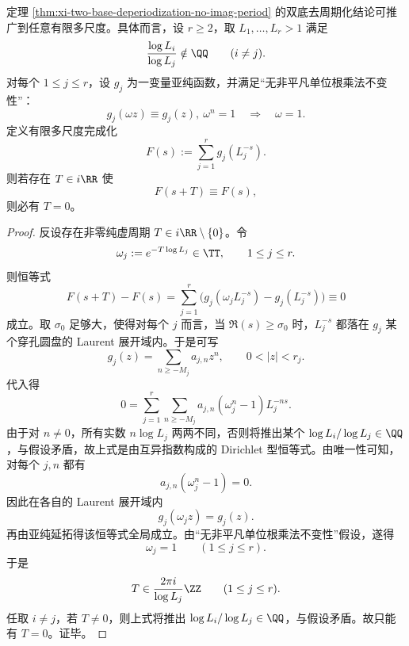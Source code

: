 \begin{theorem}[有限多尺度完成化的完全去周期化]\label{thm:xi-time-part28b-finite-multiscale-complete-deperiodization}
定理 \ref{thm:xi-two-base-deperiodization-no-imag-period} 的双底去周期化结论可推广到任意有限多尺度。具体而言，设 \(r\ge 2\)，取 \(L_1,\dots,L_r>1\) 满足
\[
\frac{\log L_i}{\log L_j}\notin\QQ
\qquad (i\neq j).
\]
对每个 \(1\le j\le r\)，设 \(g_j\) 为一变量亚纯函数，并满足“无非平凡单位根乘法不变性”：
\[
g_j(\omega z)\equiv g_j(z),\ \omega^n=1
\quad\Longrightarrow\quad
\omega=1.
\]
定义有限多尺度完成化
\[
F(s):=\sum_{j=1}^{r} g_j(L_j^{-s}).
\]
则若存在 \(T\in i\RR\) 使
\[
F(s+T)\equiv F(s),
\]
则必有 \(T=0\)。
\end{theorem}
\begin{proof}
反设存在非零纯虚周期 \(T\in i\RR\setminus\{0\}\)。令
\[
\omega_j:=e^{-T\log L_j}\in\TT,
\qquad 1\le j\le r.
\]
则恒等式
\[
F(s+T)-F(s)
=
\sum_{j=1}^{r}\bigl(g_j(\omega_j L_j^{-s})-g_j(L_j^{-s})\bigr)\equiv 0
\]
成立。取 \(\sigma_0\) 足够大，使得对每个 \(j\) 而言，当 \(\Re(s)\ge \sigma_0\) 时，\(L_j^{-s}\) 都落在 \(g_j\) 某个穿孔圆盘的 Laurent 展开域内。于是可写
\[
g_j(z)=\sum_{n\ge -M_j} a_{j,n}z^n,
\qquad 0<|z|<r_j.
\]
代入得
\[
0
=
\sum_{j=1}^{r}\sum_{n\ge -M_j}
a_{j,n}(\omega_j^n-1)L_j^{-ns}.
\]
由于对 \(n\neq 0\)，所有实数 \(n\log L_j\) 两两不同，否则将推出某个 \(\log L_i/\log L_j\in\QQ\)，与假设矛盾，故上式是由互异指数构成的 Dirichlet 型恒等式。由唯一性可知，对每个 \(j,n\) 都有
\[
a_{j,n}(\omega_j^n-1)=0.
\]
因此在各自的 Laurent 展开域内
\[
g_j(\omega_j z)=g_j(z).
\]
再由亚纯延拓得该恒等式全局成立。由“无非平凡单位根乘法不变性”假设，遂得
\[
\omega_j=1
\qquad (1\le j\le r).
\]
于是
\[
T\in \frac{2\pi i}{\log L_j}\ZZ
\qquad (1\le j\le r).
\]
任取 \(i\neq j\)，若 \(T\neq 0\)，则上式将推出 \(\log L_i/\log L_j\in\QQ\)，与假设矛盾。故只能有 \(T=0\)。证毕。
\end{proof}


